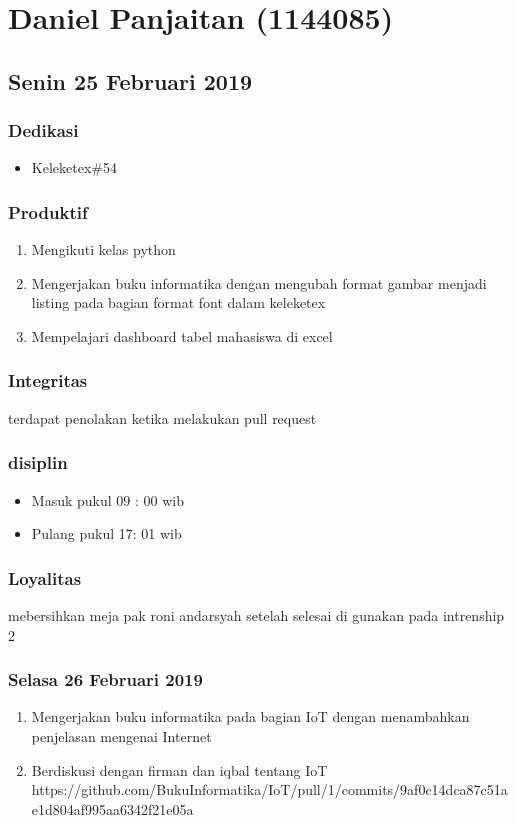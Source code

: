\chapter{Daniel Panjaitan (1144085)}


\section{Senin 25 Februari 2019}
\subsection{Dedikasi}
\begin{itemize}
  \item Keleketex\#54 
  \end{itemize}
\subsection{Produktif}
\begin{enumerate}
  \item Mengikuti kelas python
  \item Mengerjakan buku informatika dengan mengubah format gambar menjadi listing pada bagian format font dalam keleketex
  \item Mempelajari dashboard tabel mahasiswa di excel
\end{enumerate}
\subsection{Integritas}
terdapat penolakan ketika melakukan pull request
\subsection{disiplin}
\begin{itemize}
  \item Masuk pukul 09 : 00 wib
  \item Pulang pukul 17: 01 wib
\end{itemize}
\subsection{Loyalitas}
mebersihkan meja pak roni andarsyah setelah selesai di gunakan pada intrenship 2



\subsection{Selasa 26 Februari 2019}
\begin{enumerate}
  \item Mengerjakan buku informatika pada bagian IoT dengan menambahkan penjelasan mengenai Internet
  \item Berdiskusi dengan firman dan iqbal tentang IoT
  \subitem https://github.com/BukuInformatika/IoT/pull/1/commits/9af0c14dca87c51ae1d804af995aa6342f21e05a
\end{enumerate}

